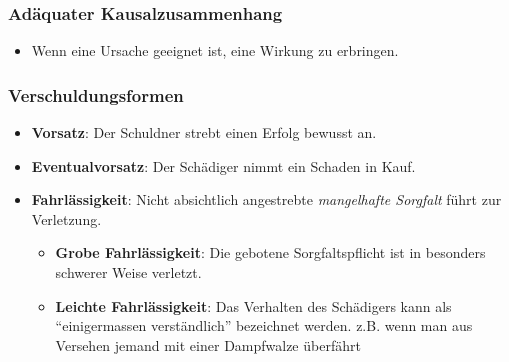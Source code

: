 \hypertarget{aduxe4quater-kausalzusammenhang}{%
\subsubsection{Adäquater
Kausalzusammenhang}\label{aduxe4quater-kausalzusammenhang}}

\begin{itemize}
\tightlist
\item
  Wenn eine Ursache geeignet ist, eine Wirkung zu erbringen.
\end{itemize}

\hypertarget{verschuldungsformen}{%
\subsubsection{Verschuldungsformen}\label{verschuldungsformen}}

\begin{itemize}
\tightlist
\item
  \textbf{Vorsatz}: Der Schuldner strebt einen Erfolg bewusst an.
\item
  \textbf{Eventualvorsatz}: Der Schädiger nimmt ein Schaden in Kauf.
\item
  \textbf{Fahrlässigkeit}: Nicht absichtlich angestrebte
  \emph{mangelhafte Sorgfalt} führt zur Verletzung.

  \begin{itemize}
  \tightlist
  \item
    \textbf{Grobe Fahrlässigkeit}: Die gebotene Sorgfaltspflicht ist in
    besonders schwerer Weise verletzt.
  \item
    \textbf{Leichte Fahrlässigkeit}: Das Verhalten des Schädigers kann
    als ``einigermassen verständlich'' bezeichnet werden. z.B. wenn man
    aus Versehen jemand mit einer Dampfwalze überfährt
  \end{itemize}
\end{itemize}
